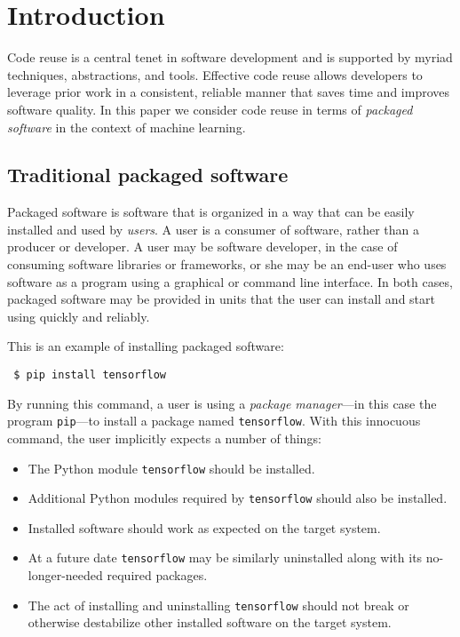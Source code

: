 \documentclass{article}
\begin{document}
\printAffiliationsAndNotice{}  %

\section{Introduction}

Code reuse is a central tenet in software development and is supported
by myriad techniques, abstractions, and tools. Effective code reuse
allows developers to leverage prior work in a consistent, reliable
manner that saves time and improves software quality. In this paper we
consider code reuse in terms of \emph{packaged software} in the
context of machine learning.

\subsection{Traditional packaged software}

Packaged software is software that is organized in a way that can be
easily installed and used by \emph{users}. A user is a consumer of
software, rather than a producer or developer. A user may be software
developer, in the case of consuming software libraries or frameworks,
or she may be an end-user who uses software as a program using a
graphical or command line interface. In both cases, packaged software
may be provided in units that the user can install and start using
quickly and reliably.

This is an example of installing packaged software:

{\footnotesize
\begin{verbatim}
 $ pip install tensorflow
\end{verbatim}}

By running this command, a user is using a \emph{package manager}---in
this case the program \verb|pip|---to install a package named
\verb|tensorflow|. With this innocuous command, the user implicitly expects
a number of things:

\begin{itemize}
\item The Python module \verb|tensorflow| should be installed.
\item Additional Python modules required by \verb|tensorflow| should
  also be installed.
\item Installed software should work as expected on the target system.
\item At a future date \verb|tensorflow| may be similarly uninstalled
  along with its no-longer-needed required packages.
\item The act of installing and uninstalling \verb|tensorflow| should
  not break or otherwise destabilize other installed software on the
  target system.
\end{itemize}
\end{document}
